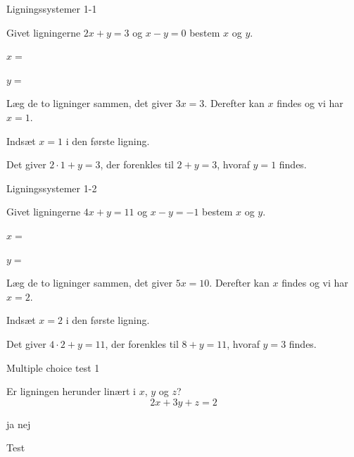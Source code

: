 \documentclass{article}
\begin{document}

\tableofcontents
\newpage

\begin{exercise}{Ligningssystemer 1-1}

Givet ligningerne \(2x + y = 3\) og \(x - y = 0\) bestem \(x\) og \(y\).

\(x = \) 

\(y = \) 

\hint

Læg de to ligninger sammen, det giver \(3x = 3\). Derefter kan \(x\) findes og vi har \(x = 1\).

\hint
Indsæt \(x = 1\) i den første ligning.

\hint
Det giver \(2 \cdot 1 + y = 3\), der forenkles til \(2 + y = 3\),
hvoraf \(y = 1\) findes.

\end{exercise}



\begin{exercise}{Ligningssystemer 1-2}

Givet ligningerne \(4x + y = 11\) og \(x - y = -1\) bestem \(x\) og \(y\).

\(x = \) 

\(y = \) 

\hint

Læg de to ligninger sammen, det giver \(5x = 10\). Derefter kan \(x\) findes og vi har \(x = 2\).

\hint
Indsæt \(x = 2\) i den første ligning.

\hint
Det giver \(4 \cdot 2 + y = 11\), der forenkles til \(8 + y = 11\),
hvoraf \(y = 3\) findes.

\end{exercise}



\begin{exercise}{Multiple choice test 1}

Er ligningen herunder linært i $x$, $y$ og $z$?
\[
2x + 3y + z = 2
\]

\begin{multichoice}
\itemtrue ja
\itemfalse nej
\end{multichoice}

\hint
Test

\end{exercise}
\end{document}
